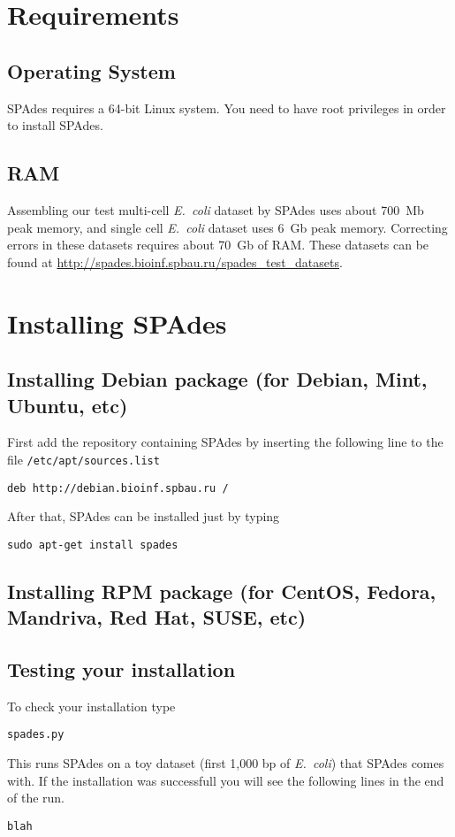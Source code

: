 \documentclass{article}
\def\spades{SPAdes}
\def\ecoli{\it E.~coli}
\begin{document}
\section{Requirements}
\subsection{Operating System}
{\spades} requires a 64-bit Linux system.
You need to have root privileges in order to install {\spades}.

\subsection{RAM}
Assembling our test multi-cell {\ecoli} dataset 
by {\spades} uses about 700~Mb peak memory, and single cell
{\ecoli} dataset uses 6~Gb peak memory. 
Correcting errors in these datasets requires about 70~Gb of RAM.
These datasets can be found at \url{http://spades.bioinf.spbau.ru/spades_test_datasets}.

\section{Installing {\spades}}

\subsection{Installing Debian package (for Debian, Mint, Ubuntu, etc)}
First add the repository containing {\spades} by inserting the following line
to the file {\tt /etc/apt/sources.list}
\begin{lstlisting}
deb http://debian.bioinf.spbau.ru /
\end{lstlisting}
After that, {\spades} can be installed just by typing
\begin{lstlisting}
sudo apt-get install spades
\end{lstlisting}

\subsection{Installing RPM package (for CentOS, Fedora, Mandriva, Red Hat, SUSE, etc)}


\subsection{Testing your installation}
To check your installation type
\begin{lstlisting}
spades.py
\end{lstlisting}
This runs {\spades} on a toy dataset (first 1,000 bp of {\ecoli}) that {\spades} comes with. If the installation was successfull you will see the following lines in the end of the run.
\begin{lstlisting}
blah
\end{lstlisting}
\end{document}

